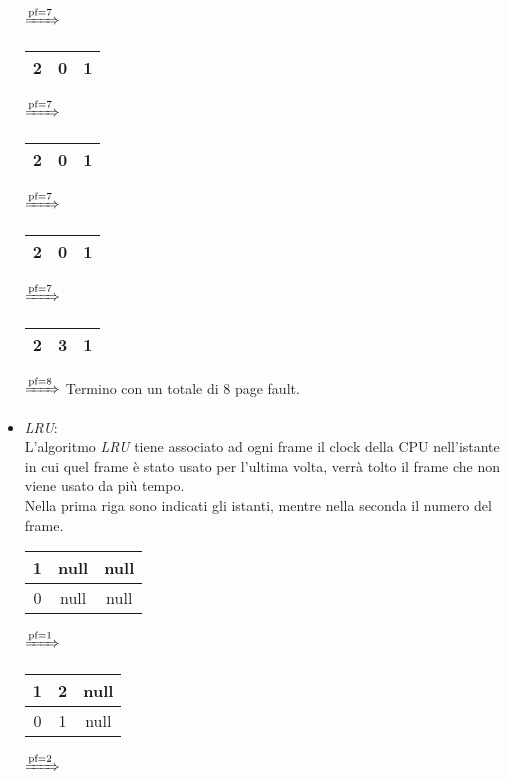 \documentclass{article}
\begin{document}
\begin{itemize}
\begin{tabular}{|c|c|c|}
                \hline
            \end{tabular}
            $\xRightarrow{\text{pf}=7}$
            \begin{tabular}{|c|c|c|}
                \hline
                2 & 0 & 1\\
                \hline
            \end{tabular}
            $\xRightarrow{\text{pf}=7}$
            \begin{tabular}{|c|c|c|}
                \hline
                2 & 0 & 1\\
                \hline
            \end{tabular}
            $\xRightarrow{\text{pf}=7}$
            \begin{tabular}{|c|c|c|}
                \hline
                2 & 0 & 1\\
                \hline
            \end{tabular}
            $\xRightarrow{\text{pf}=7}$
            \begin{tabular}{|c|c|c|}
                \hline
                2 & 3 & 1\\
                \hline
            \end{tabular}
            $\xRightarrow{\text{pf}=8}$
            Termino con un totale di 8 page fault.
        \item \emph{LRU}:\\
        L'algoritmo \emph{LRU} tiene associato ad ogni frame il clock della CPU nell'istante in cui quel frame è stato usato per l'ultima volta, verrà tolto il frame che non viene usato da più tempo.\\
        Nella prima riga sono indicati gli istanti, mentre nella seconda il numero del frame.\\
        \begin{tabular}{|c|c|c|}
            \hline
            1 & null & null\\
            \hline
            0 & null & null\\
            \hline
        \end{tabular}
        $\xRightarrow{\text{pf}=1}$
        \begin{tabular}{|c|c|c|}
            \hline
            1 & 2 & null\\
            \hline
            0 & 1 & null\\
            \hline
        \end{tabular}
        $\xRightarrow{\text{pf}=2}$
        \begin{tabular}{|c|c|c|}

\end{tabular}
\end{itemize}
\end{document}
